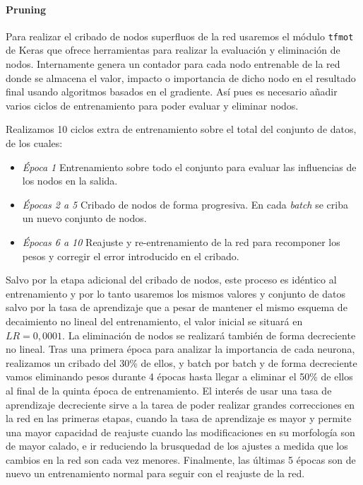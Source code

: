 \paragraph{Pruning}
Para realizar el cribado de nodos superfluos de la red usaremos el módulo \texttt{tfmot} de Keras que ofrece herramientas para realizar la evaluación y eliminación de nodos. Internamente genera un contador para cada nodo entrenable de la red donde se almacena el valor, impacto o importancia de dicho nodo en el resultado final usando algoritmos basados en el gradiente. Así pues es necesario añadir varios ciclos de entrenamiento para poder evaluar y eliminar nodos. 

Realizamos 10 ciclos extra de entrenamiento sobre el total del conjunto de datos, de los cuales:
\begin{itemize}
  \item \textsl{Época 1} Entrenamiento sobre todo el conjunto para evaluar las influencias de los nodos en la salida.
  \item \textsl{Épocas 2 a 5} Cribado de nodos de forma progresiva. En cada \textit{batch} se criba un nuevo conjunto de nodos.
  \item \textsl{Épocas 6 a 10} Reajuste y re-entrenamiento de la red para recomponer los pesos y corregir el error introducido en el cribado.
\end{itemize}

Salvo por la etapa adicional del cribado de nodos, este proceso es idéntico al entrenamiento y por lo tanto usaremos los mismos valores y conjunto de datos salvo por la tasa de aprendizaje que a pesar de mantener el mismo esquema de decaimiento no lineal del entrenamiento, el valor inicial se situará en $LR=0,0001$. La eliminación de nodos se realizará también de forma decreciente no lineal. Tras una primera época para analizar la importancia de cada neurona, realizamos un cribado del 30\% de ellos, y batch por batch y de forma decreciente vamos eliminando pesos durante 4 épocas hasta llegar a eliminar el 50\% de ellos al final de la quinta época de entrenamiento. El interés de usar una tasa de aprendizaje decreciente sirve a la tarea de poder realizar grandes correcciones en la red en las primeras etapas, cuando la tasa de aprendizaje es mayor y permite una mayor capacidad de reajuste cuando las modificaciones en su morfología son de mayor calado,  e ir reduciendo la brusquedad de los ajustes a medida que los cambios en la red son cada vez menores. Finalmente, las últimas 5 épocas son de nuevo un entrenamiento normal para seguir con el reajuste de la red. 

